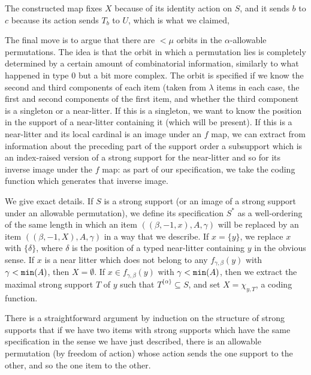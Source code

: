 The constructed map fixes $X$ because of its identity action on $S$, and it sends $b$ to $c$ because its action sends $T_b$ to $U$, which is what we claimed,

The final move is to argue that there are $<\mu$ orbits in the $\alpha$-allowable permutations.  The idea is that the orbit in which a permutation lies
is completely determined by a certain amount of combinatorial information, similarly to what happened in type 0 but a bit more complex.  The orbit is specified if we know the second and third components of each item (taken from $\lambda$ items in each case, the first and second components of the first item, and whether the third component is a singleton or a near-litter.  If this is a singleton, we want to know the position in the support of a near-litter containing it (which will be present).  If this is a near-litter and its local cardinal is an image under an $f$ map, we can extract from information about the preceding part of the support order a subsupport which is an index-raised version of a strong support for the near-litter and so for its inverse image under the $f$ map:  as part of our specification, we take the coding function which generates that inverse image.

We give exact details.  If $S$ is a strong support (or an image of a strong support under an allowable permutation), we define
its specification $S^*$ as a well-ordering of the same length in which an item $((\beta,-1,x),A,\gamma)$ will be replaced by an item
$((\beta,-1,X),A,\gamma)$ in a way that we describe.  If $x=\{y\}$, we replace $x$ with $\{\delta\}$, where $\delta$ is the position of a typed near-litter containing $y$ in the obvious sense.  If $x$ is a near litter which does not belong to any $f_{\gamma,\beta}(y)$ with $\gamma<{\tt min}(A)$, then
$X= \emptyset$.  If $x \in f_{\gamma,\beta}(y)$ with $\gamma<{\tt min}(A)$, then we extract the maximal strong support $T$ of $y$ such that
$T^{\{\alpha\}} \subseteq S$, and set $X = \chi_{y,T}$, a coding function.

There is a straightforward argument by induction on the structure of strong supports that if we have two items with strong supports which have the same specification in the sense we have just described, there is an allowable permutation (by freedom of action) whose action sends the one support to the other, and so the one item to the other.

